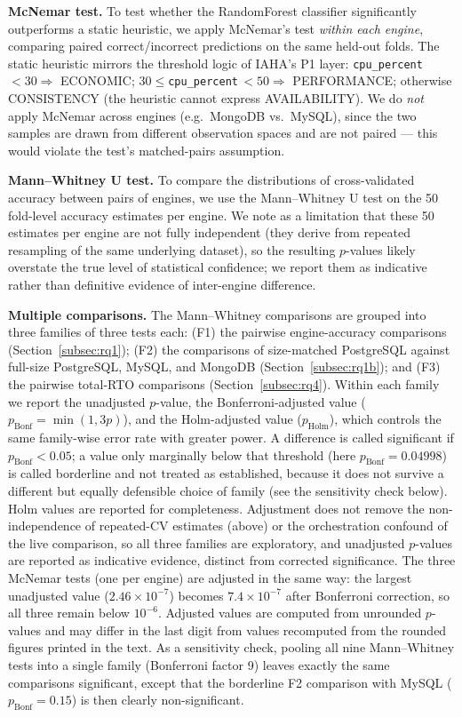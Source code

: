 \documentclass[iicol,pdflatex,sn-mathphys-num]{sn-jnl}
\theoremstyle{thmstyleone}
\theoremstyle{thmstylethree}
\begin{document}
\textbf{McNemar test.} To test whether the RandomForest classifier
significantly outperforms a static heuristic, we apply McNemar's test
\emph{within each engine}, comparing paired correct/incorrect
predictions on the same held-out folds. The static heuristic mirrors
the threshold logic of IAHA's P1 layer: \texttt{cpu\_percent}\,$<30 \Rightarrow$
ECONOMIC; $30\leq$\texttt{cpu\_percent}\,$<50 \Rightarrow$ PERFORMANCE;
otherwise CONSISTENCY (the heuristic cannot express AVAILABILITY).
We do \emph{not} apply McNemar across engines (e.g.\ MongoDB vs.\
MySQL), since the two samples are drawn from different observation
spaces and are not paired --- this would violate the test's
matched-pairs assumption.

\textbf{Mann--Whitney U test.} To compare the distributions of
cross-validated accuracy between pairs of engines, we use the
Mann--Whitney U test on the 50 fold-level accuracy estimates per
engine. We note as a limitation that these 50 estimates per engine are
not fully independent (they derive from repeated resampling of the
same underlying dataset), so the resulting $p$-values likely overstate
the true level of statistical confidence; we report them as indicative
rather than definitive evidence of inter-engine difference.

\textbf{Multiple comparisons.} The Mann--Whitney comparisons are
grouped into three families of three tests each: (F1) the pairwise
engine-accuracy comparisons (Section~\ref{subsec:rq1}); (F2) the
comparisons of size-matched PostgreSQL against full-size PostgreSQL,
MySQL, and MongoDB (Section~\ref{subsec:rq1b}); and (F3) the pairwise
total-RTO comparisons (Section~\ref{subsec:rq4}). Within each family we
report the unadjusted $p$-value, the Bonferroni-adjusted value
($p_{\text{Bonf}}=\min(1,3p)$), and the Holm-adjusted value
($p_{\text{Holm}}$), which controls the same family-wise error rate with
greater power. A difference is called significant if
$p_{\text{Bonf}}<0.05$; a value only marginally below that threshold
(here $p_{\text{Bonf}}=0.04998$) is called borderline and not treated
as established, because it does not survive a different but equally
defensible choice of family (see the sensitivity check below). Holm
values are reported for completeness.
Adjustment does not remove the non-independence of repeated-CV
estimates (above) or the orchestration confound of the live comparison,
so all three families are exploratory, and unadjusted $p$-values are
reported as indicative evidence, distinct from corrected significance.
The three McNemar tests (one per engine) are adjusted in the same way:
the largest unadjusted value ($2.46\times10^{-7}$) becomes
$7.4\times10^{-7}$ after Bonferroni correction, so all three remain
below $10^{-6}$. Adjusted values are computed from unrounded
$p$-values and may differ in the last digit from values recomputed
from the rounded figures printed in the text. As a sensitivity check,
pooling all nine Mann--Whitney tests into a single family (Bonferroni
factor 9) leaves exactly the same comparisons significant, except that
the borderline F2 comparison with MySQL ($p_{\text{Bonf}}=0.15$) is
then clearly non-significant.
\end{document}
